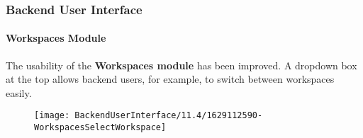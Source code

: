 %

\begin{frame}[fragile]
	\frametitle{Backend User Interface}
	\framesubtitle{Workspaces Module}

	The usability of the \textbf{Workspaces module} has been improved. A dropdown
	box at the top allows backend users, for example, to switch between workspaces
	easily.

	\begin{figure}
		\texttt{[image: BackendUserInterface/11.4/1629112590-WorkspacesSelectWorkspace]}
	\end{figure}

\end{frame}

